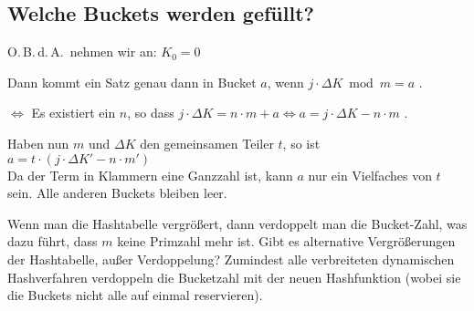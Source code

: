 \begin{solution}
\subsection{\color{solutioncolor}Welche Buckets werden gefüllt?}

O.\,B.\,d.\,A.\ nehmen wir an: $K_0 = 0$

Dann kommt ein Satz genau dann in Bucket $a$, wenn
$j \cdot \Delta K \bmod m = a$ .

$\Leftrightarrow$ Es existiert ein $n$, so dass $j \cdot \Delta K = n  \cdot m + a\Leftrightarrow a = j  \cdot \Delta K - n \cdot m$ .

Haben nun $m$ und $\Delta K$ den gemeinsamen Teiler $t$, so ist $a = t \cdot (j \cdot \Delta K' - n \cdot m')$ \\
Da der Term in Klammern eine Ganzzahl ist, kann $a$ nur ein Vielfaches von $t$ sein. Alle anderen Buckets bleiben leer.
\end{solution}

\begin{note}
Wenn man die Hashtabelle vergrößert, dann verdoppelt man die Bucket-Zahl, was dazu führt, dass $m$ keine Primzahl mehr ist. Gibt es alternative Vergrößerungen der Hashtabelle, außer Verdoppelung? Zumindest alle verbreiteten dynamischen Hashverfahren verdoppeln die Bucketzahl mit der neuen Hashfunktion (wobei sie die Buckets nicht alle auf einmal reservieren).
\end{note}
